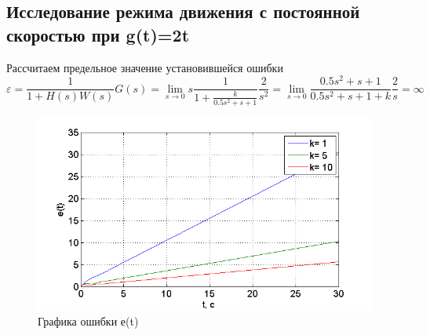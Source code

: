 \documentclass[a4paper, 12pt]{article}
\begin{document}
\subsection{Исследование режима движения с постоянной скоростью при g(t)=2t}\hfill\par
Рассчитаем предельное значение установившейся ошибки\\
\begin{equation}
\varepsilon  = \frac{1}{{1 + H\left( s \right)W\left( s \right)}}G\left( s \right) = \mathop {\lim }\limits_{s \to 0} s\frac{1}{{1 + \frac{k}{{0.5{s^2} + s + 1}}}}\frac{2}{{{s^2}}} = \mathop {\lim }\limits_{s \to 0} \frac{{0.5{s^2} + s + 1}}{{0.5{s^2} + s + 1 + k}}\frac{2}{s} = \infty 
\end{equation}
\begin{center}

	\begin{figure}[h]
		\centering
			\includegraphics[width=0.7\linewidth]{33}
		\caption{Графика ошибки е(t)}
		\label{fig:33}
	\end{figure}
\end{center}
\end{document}

